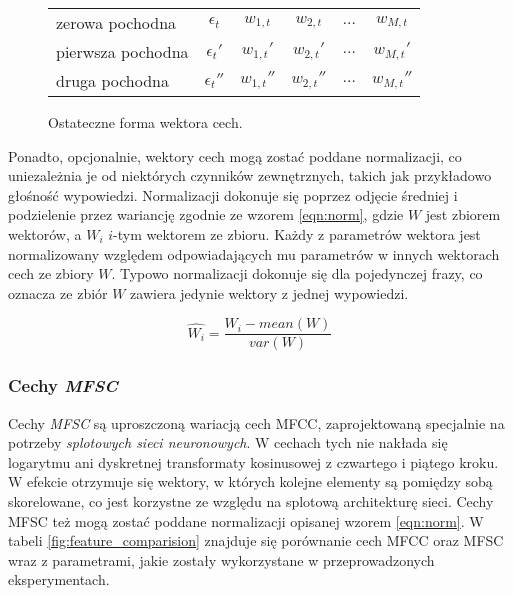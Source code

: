 \documentclass[11pt]{article}
\begin{document}
	\begin{figure}[H]
		\begin{center}
			\begin{tabular}{l|ccccc}
				zerowa pochodna   & $\epsilon_t$   & $w_{1,t}$   & $w_{2,t}$   & $\ldots$ & $w_{M,t}$   \\
				pierwsza pochodna & $\epsilon_t'$  & $w_{1,t}'$  & $w_{2,t}'$  & $\ldots$ & $w_{M,t}'$  \\
				druga pochodna    & $\epsilon_t''$ & $w_{1,t}''$ & $w_{2,t}''$ & $\ldots$ & $w_{M,t}''$ \\
			\end{tabular}
			\label{fig:feature_vector}
			\caption{Ostateczne forma wektora cech.}
		\end{center}
	\end{figure}

	Ponadto, opcjonalnie, wektory cech mogą zostać poddane normalizacji, co uniezależnia je od niektórych czynników zewnętrznych, takich jak przykładowo głośność wypowiedzi. Normalizacji dokonuje się poprzez odjęcie średniej i podzielenie przez wariancję zgodnie ze wzorem \ref{eqn:norm}, gdzie $W$ jest zbiorem wektorów, a $W_i$ $i$-tym wektorem ze zbioru. Każdy z parametrów wektora jest normalizowany względem odpowiadających mu parametrów w innych wektorach cech ze zbiory $W$. Typowo normalizacji dokonuje się dla pojedynczej frazy, co oznacza ze zbiór $W$ zawiera jedynie wektory z jednej wypowiedzi.
	
	\begin{equation}
		\hat{W_i} = \frac{W_i - mean(W)}{var(W)}
		\label{eqn:norm}
	\end{equation}

	\subsubsection{Cechy \textit{MFSC}}
	\label{sec:Feature_vec_mfsc}
	
	Cechy \textit{MFSC} są uproszczoną wariacją cech MFCC, zaprojektowaną specjalnie na potrzeby \textit{splotowych sieci neuronowych}. W cechach tych nie nakłada się logarytmu ani dyskretnej transformaty kosinusowej z czwartego i piątego kroku. W efekcie otrzymuje się wektory, w których kolejne elementy są pomiędzy sobą skorelowane, co jest korzystne ze względu na splotową architekturę sieci. Cechy MFSC też mogą zostać poddane normalizacji opisanej wzorem \ref{eqn:norm}. W tabeli \ref{fig:feature_comparision} znajduje się porównanie cech MFCC oraz MFSC wraz z parametrami, jakie zostały wykorzystane w przeprowadzonych eksperymentach.
	
\end{document}
